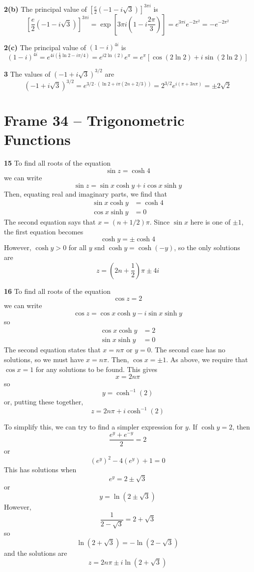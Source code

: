 \documentclass{article}
\begin{document}
\textbf{2(b)}
The principal value of $[\frac{e}{2}(-1 - i\sqrt{3})]^{3\pi i}$ is
\[
	[\frac{e}{2}(-1 - i\sqrt{3})]^{3\pi i}
	= \exp\left[3\pi i \left( 1 - i\frac{2\pi}{3}\right) \right]
	= e^{3\pi i} e^{-2\pi^2}
	= -e^{-2\pi^2}
\]

\textbf{2(c)}
The principal value of $(1 - i)^{4i}$ is
\[
	(1 - i)^{4i}
	= e^{4i (\frac{1}{2} \ln 2 - i\pi/4)}
	= e^{i 2\ln(2)} e^{\pi}
	= e^{\pi} [\cos(2\ln2) + i\sin(2\ln2)]
\]

\textbf{3}
The values of $(-1 + i\sqrt{3})^{3/2}$ are
\[
	(-1 + i\sqrt{3})^{3/2}
	= e^{3/2 \cdot (\ln 2 + i \pi(2n + 2/3))}
	= 2^{3/2} e^{i (\pi + 3n\pi)}
	= \pm 2\sqrt{2}
\]


\clearpage
\section{Frame 34 -- Trigonometric Functions}
\textbf{15}
To find all roots of the equation
\[
	\sin z = \cosh 4
\]
we can write
\[
	\sin z = \sin x \cosh y + i \cos x \sinh y
\]
Then, equating real and imaginary parts, we find that
\begin{align*}
	\sin x \cosh y &= \cosh 4 \\
	\cos x \sinh y &= 0
\end{align*}
The second equation says that $x = (n + 1/2) \pi$. Since $\sin x$ here is one of $\pm 1$, the first equation becomes
\[
	\cosh y = \pm \cosh 4
\]
However, $\cosh y > 0$ for all $y$ snd $\cosh y = \cosh (-y)$, so the only solutions are
\[
	z = \left(2n + \frac{1}{2} \right) \pi \pm 4i
\]

\textbf{16}
To find all roots of the equation
\[
	\cos z = 2
\]
we can write
\[
	\cos z = \cos x \cosh y - i \sin x \sinh y
\]
so
\begin{align*}
	\cos x \cosh y &= 2	\\
	\sin x \sinh y &= 0
\end{align*}
The second equation states that $x = n\pi$ or $y = 0$. The second case has no solutions, so we must have $x = n\pi$. Then, $\cos x = \pm 1$. As above, we require that $\cos x = 1$ for any solutions to be found. This gives
\[
	x = 2n\pi 
\]
so
\[
	y = \cosh^{-1}(2)
\]
or, putting these together,
\[
	z = 2n\pi + i \cosh^{-1}(2)
\]

To simplify this, we can try to find a simpler expression for $y$. If $\cosh y = 2$, then
\[
	\frac{e^{y} + e^{-y}}{2} = 2
\]
or
\[
	(e^y)^2 - 4(e^y) + 1 = 0
\]
This has solutions when
\[
	e^y = 2 \pm \sqrt{3}
\]
or
\[
	y = \ln(2 \pm \sqrt{3})
\]
However, 
\[
	\frac{1}{2 - \sqrt{3}} = 2 + \sqrt{3}
\]
so
\[
	\ln(2 + \sqrt{3}) = -\ln(2 - \sqrt{3})
\]
and the solutions are
\[
	z = 2n\pi \pm i \ln(2 + \sqrt{3})
\]
\end{document}
